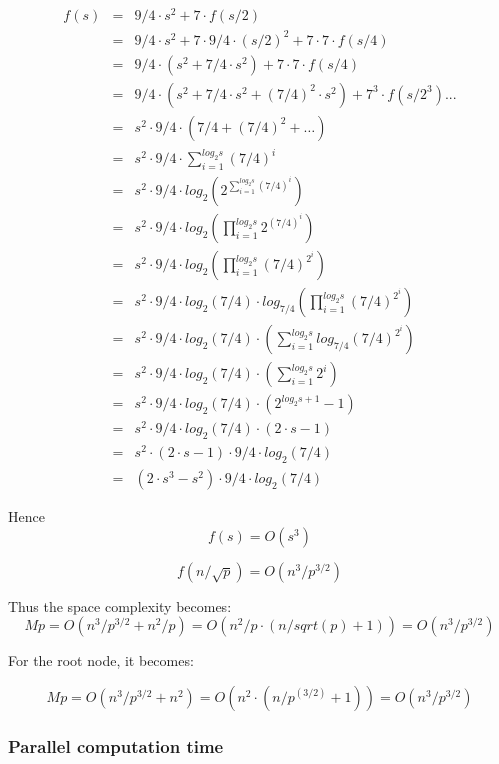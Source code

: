 \documentclass{article}
\begin{document}
\begin{eqnarray*}
f(s) &=& 9/4\cdot s^2 + 7\cdot f(s/2)	\\
&=& 9/4\cdot  s^2 + 7\cdot  9/4\cdot  (s/2)^2 + 7\cdot  7\cdot  f(s/4)	\\
&=& 9/4\cdot  (s^2 + 7/4\cdot  s^2) + 7\cdot  7\cdot  f(s/4)	\\
&=& 9/4\cdot  ( s^2 + 7/4\cdot  s^2 + (7/4)^2\cdot  s^2 ) +7^3\cdot  f(s/2^3) ... 	\\
&=& s^2 \cdot   9/4 \cdot   (7/4 + (7/4)^2 + \dots)	\\
&=& s^2 \cdot   9/4 \cdot   \sum\limits_{i=1}^{log_2 s} (7/4)^i 	\\
&=& s^2 \cdot   9/4 \cdot   log_2(2^{\sum\limits_{i=1}^{log_2 s} (7/4)^i}) 	\\
&=& s^2 \cdot   9/4 \cdot   log_2(\prod\limits_{i=1}^{log_2 s} 2^{(7/4)^i}) 	\\
&=& s^2 \cdot   9/4 \cdot   log_2(\prod\limits_{i=1}^{log_2 s} (7/4)^{2^i}) 	\\
&=& s^2 \cdot   9/4 \cdot   log_2(7/4) \cdot   log_{7/4}(\prod\limits_{i=1}^{log_2 s} (7/4)^{2^i}) 	\\
&=& s^2 \cdot   9/4 \cdot   log_2(7/4) \cdot   (\sum\limits_{i=1}^{log_2 s} log_{7/4}(7/4)^{2^i}) 	\\
&=& s^2 \cdot   9/4 \cdot   log_2(7/4) \cdot   (\sum\limits_{i=1}^{log_2 s} 2^i) 	\\
&=& s^2 \cdot   9/4 \cdot   log_2(7/4) \cdot   (2^{log_2 s+1} - 1) 	\\
&=& s^2 \cdot   9/4 \cdot   log_2(7/4) \cdot   (2\cdot  s - 1) 	\\
&=& s^2 \cdot   (2\cdot  s - 1) \cdot   9/4 \cdot   log_2(7/4) 	\\
&=& (2\cdot  s^3 - s^2) \cdot   9/4 \cdot   log_2(7/4)
\end{eqnarray*}

Hence
$$f(s) = O(s^3)$$

	
$$f(n/\sqrt{p}) = O(n^3/p^{3/2})$$

Thus the space complexity becomes:
$$Mp = O(n^3/p^{3/2} + n^2/p) = O(n^2/p \cdot (n/sqrt(p)+1)) = O(n^3/p^{3/2})$$

For the root node, it becomes:

$$Mp = O(n^3/p^{3/2} + n^2) = O(n^2 \cdot (n/p^(3/2) + 1)) = O(n^3/p^{3/2})$$


\subsubsection{Parallel computation time}
\end{document}
